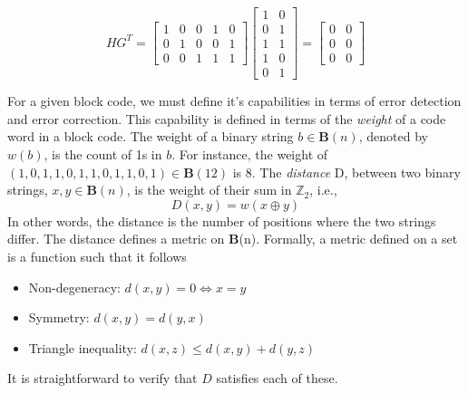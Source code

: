 \documentclass{article}
\begin{document}
\[
HG^T = \begin{bmatrix}
1 & 0 & 0 & 1 & 0 \\
0 & 1 & 0 & 0 & 1 \\
0 & 0 & 1 & 1 & 1
\end{bmatrix}
\begin{bmatrix}
1 & 0 \\
0 & 1 \\
1 & 1 \\
1 & 0 \\
0 & 1
\end{bmatrix}
= 
\begin{bmatrix}
0 & 0 \\
0 & 0 \\
0 & 0
\end{bmatrix}
\]

For a given block code, we must define it's capabilities in terms of error detection and error
correction. This capability is defined in terms of the \textit{weight} of a code word in a 
block code. The weight of a binary string \(b \in \mathbf{B}(n)\), denoted by \(w(b)\), is the count of
1s in \(b\). For instance, the weight of \((1,0,1,1,0,1,1,0,1,1,0,1) \in \mathbf{B}(12)\) is 8.
The \textit{distance} D, between two binary strings, \(x , y \in \mathbf{B}(n)\), is the weight of their 
sum in \(\mathbb{Z}_2\), i.e., 
\[D(x, y) = w(x \oplus y)\]
In other words, the distance is the number of positions where the two strings differ.
The distance defines a metric on \textbf{B}(n). Formally, a metric defined on a set is a function such 
that it follows
\begin{itemize}
\item Non-degeneracy: \(d(x, y) = 0 \iff x = y\)
\item Symmetry: \(d(x, y) = d(y, x)\)
\item Triangle inequality: \(d(x, z) \leq d(x, y) + d(y, z)\)
\end{itemize}
It is straightforward to verify that \(D\) satisfies each of these.
\end{document}

